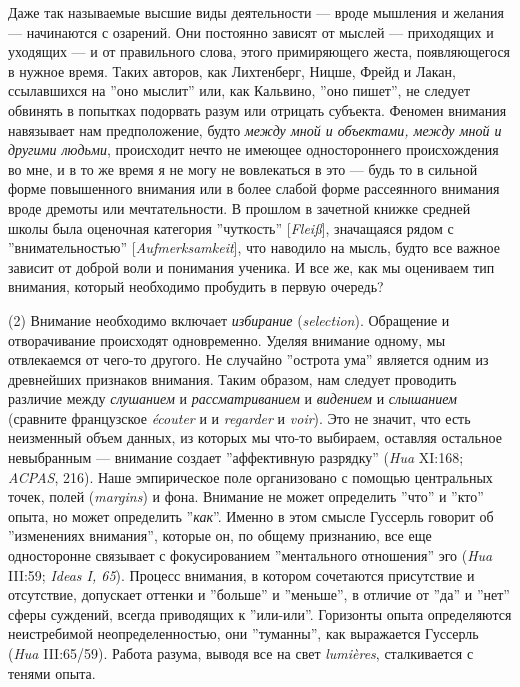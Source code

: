 \documentclass[12pt]{book}
\begin{document}
Даже так называемые высшие виды деятельности --- вроде мышления и желания --- начинаются с озарений. Они постоянно зависят от мыслей --- приходящих и уходящих --- и от правильного слова, этого примиряющего жеста, появляющегося в нужное время. Таких авторов, как Лихтенберг, Ницше, Фрейд и Лакан, ссылавшихся на ''оно мыслит'' или, как Кальвино, ''оно пишет'', не следует обвинять в попытках подорвать разум или отрицать субъекта. Феномен внимания навязывает нам предположение, будто \textit{между мной и объектами, между мной и другими людьми}, происходит нечто не имеющее одностороннего происхождения во мне, и в то же время я не могу не вовлекаться в это --- будь то в сильной форме повышенного внимания или в более слабой форме рассеянного внимания вроде дремоты или мечтательности. В прошлом в зачетной книжке средней школы была оценочная категория ''чуткость'' [\textit{Fleiß}], значащаяся рядом с ''внимательностью'' [\textit{Aufmerksamkeit}], что наводило на мысль, будто все важное зависит от доброй воли и понимания ученика. И все же, как мы оцениваем тип внимания, который необходимо пробудить в первую очередь?

(2) Внимание необходимо включает \textit{избирание} (\textit{selection}). Обращение и отворачивание происходят одновременно. Уделяя внимание одному, мы отвлекаемся от чего-то другого. Не случайно ''острота ума'' является одним из древнейших признаков внимания. Таким образом, нам следует проводить различие между \textit{слушанием} и \textit{рассматриванием} и \textit{видением} и \textit{слышанием} (сравните французское \textit{écouter} и  и \textit{regarder} и \textit{voir}). Это не значит, что есть неизменный объем данных, из которых мы что-то выбираем, оставляя остальное невыбранным --- внимание создает ''аффективную разрядку'' (\textit{Hua} XI:168; \textit{ACPAS}, 216). Наше эмпирическое поле организовано с помощью центральных точек, полей (\textit{margins}) и фона. Внимание не может определить ''что'' и ''кто'' опыта, но может определить ''\textit{как}''. Именно в этом смысле Гуссерль говорит об ''изменениях внимания'', которые он, по общему признанию, все еще односторонне связывает с фокусированием ''ментального отношения'' эго (\textit{Hua} III:59; \textit{Ideas I, 65}). Процесс внимания, в котором сочетаются присутствие и отсутствие, допускает оттенки и ''больше'' и ''меньше'', в отличие от ''да'' и ''нет'' сферы суждений, всегда приводящих к ''или-или''. Горизонты опыта определяются неистребимой неопределенностью, они ''туманны'', как выражается Гуссерль (\textit{Hua} III:65/59). Работа разума, выводя все на свет \textit{lumières}, сталкивается с тенями опыта.
\end{document}
